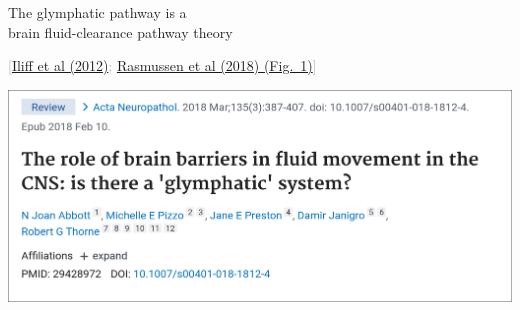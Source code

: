 \documentclass[mathserif, aspectratio=169]{beamer}
\newcommand{\refer}[1]{\begin{flushright}{\tiny \textcolor{darkgray}{[#1]}}\end{flushright}}
\begin{document}
{
\begin{frame}
  \vspace{1em}
  The glymphatic pathway is a \\ brain fluid-clearance pathway theory
  \vspace{18em}
  \refer{\href{https://stm.sciencemag.org/content/4/147/147ra111.full}{Iliff et al (2012)}; \href{https://doi.org/10.1016/S1474-4422(18)30318-1}{Rasmussen et al (2018) (Fig.~1)}}
\end{frame}
}

\begin{frame}
  \begin{center}
    \includegraphics[width=\textwidth]{graphics/abbott_2018.png}
  \end{center}
\end{frame}






\end{document}
